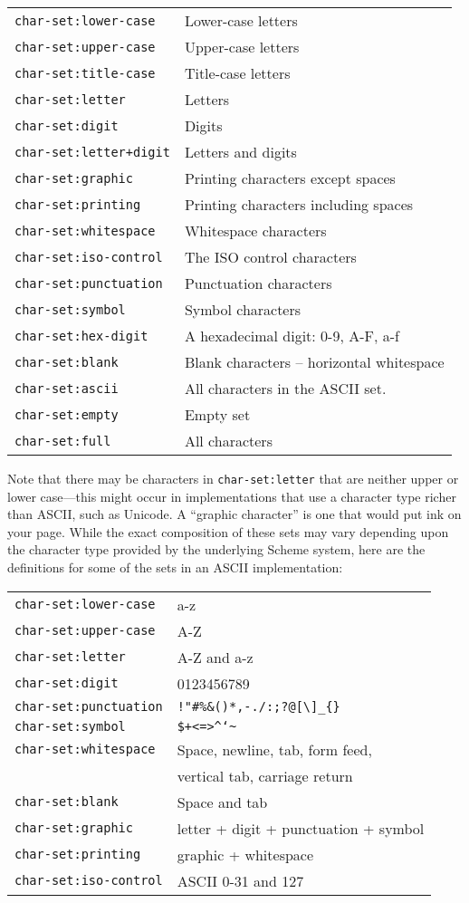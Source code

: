 \begin{longtable}[]{@{}ll@{}}
\toprule
\texttt{char-set:lower-case} & Lower-case letters\tabularnewline
\texttt{char-set:upper-case} & Upper-case letters\tabularnewline
\texttt{char-set:title-case} & Title-case letters\tabularnewline
\texttt{char-set:letter} & Letters\tabularnewline
\texttt{char-set:digit} & Digits\tabularnewline
\texttt{char-set:letter+digit} & Letters and digits\tabularnewline
\texttt{char-set:graphic} & Printing characters except
spaces\tabularnewline
\texttt{char-set:printing} & Printing characters including
spaces\tabularnewline
\texttt{char-set:whitespace} & Whitespace characters\tabularnewline
\texttt{char-set:iso-control} & The ISO control
characters\tabularnewline
\texttt{char-set:punctuation} & Punctuation characters\tabularnewline
\texttt{char-set:symbol} & Symbol characters\tabularnewline
\texttt{char-set:hex-digit} & A hexadecimal digit: 0-9, A-F,
a-f\tabularnewline
\texttt{char-set:blank} & Blank characters -- horizontal
whitespace\tabularnewline
\texttt{char-set:ascii} & All characters in the ASCII
set.\tabularnewline
\texttt{char-set:empty} & Empty set\tabularnewline
\texttt{char-set:full} & All characters\tabularnewline
\bottomrule
\end{longtable}

Note that there may be characters in \texttt{char-set:letter} that are
neither upper or lower case---this might occur in implementations that
use a character type richer than ASCII, such as Unicode. A ``graphic
character'' is one that would put ink on your page. While the exact
composition of these sets may vary depending upon the character type
provided by the underlying Scheme system, here are the definitions for
some of the sets in an ASCII implementation:

\begin{longtable}[]{@{}ll@{}}
\toprule
\texttt{char-set:lower-case} & a-z\tabularnewline
\texttt{char-set:upper-case} & A-Z\tabularnewline
\texttt{char-set:letter} & A-Z and a-z\tabularnewline
\texttt{char-set:digit} & 0123456789\tabularnewline
\texttt{char-set:punctuation} &
\texttt{!"\#\%\&\textquotesingle{}()*,-./:;?@{[}\textbackslash{}{]}\_\{\}}\tabularnewline
\texttt{char-set:symbol} &
\texttt{\$+\textless{}=\textgreater{}\^{}`\textbar{}\textasciitilde{}}\tabularnewline
\texttt{char-set:whitespace} & Space, newline, tab, form
feed,\tabularnewline
& vertical tab, carriage return\tabularnewline
\texttt{char-set:blank} & Space and tab\tabularnewline
\texttt{char-set:graphic} & letter + digit + punctuation +
symbol\tabularnewline
\texttt{char-set:printing} & graphic + whitespace\tabularnewline
\texttt{char-set:iso-control} & ASCII 0-31 and 127\tabularnewline
\bottomrule
\end{longtable}

